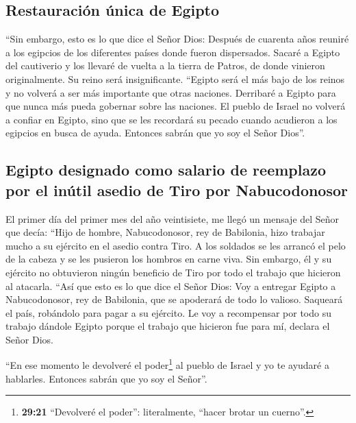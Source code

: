 \hypertarget{restauraciuxf3n-uxfanica-de-egipto}{%
\subsection{Restauración única de
Egipto}\label{restauraciuxf3n-uxfanica-de-egipto}}

 ``Sin embargo, esto es lo que dice el Señor Dios:
Después de cuarenta años reuniré a los egipcios de los diferentes países
donde fueron dispersados.  Sacaré a Egipto del cautiverio
y los llevaré de vuelta a la tierra de Patros, de donde vinieron
originalmente. Su reino será insignificante.  ``Egipto
será el más bajo de los reinos y no volverá a ser más importante que
otras naciones. Derribaré a Egipto para que nunca más pueda gobernar
sobre las naciones.  El pueblo de Israel no volverá a
confiar en Egipto, sino que se les recordará su pecado cuando acudieron
a los egipcios en busca de ayuda. Entonces sabrán que yo soy el Señor
Dios''.

\hypertarget{egipto-designado-como-salario-de-reemplazo-por-el-inuxfatil-asedio-de-tiro-por-nabucodonosor}{%
\subsection{Egipto designado como salario de reemplazo por el inútil
asedio de Tiro por
Nabucodonosor}\label{egipto-designado-como-salario-de-reemplazo-por-el-inuxfatil-asedio-de-tiro-por-nabucodonosor}}

 El primer día del primer mes del año veintisiete, me
llegó un mensaje del Señor que decía:  ``Hijo de hombre,
Nabucodonosor, rey de Babilonia, hizo trabajar mucho a su ejército en el
asedio contra Tiro. A los soldados se les arrancó el pelo de la cabeza y
se les pusieron los hombros en carne viva. Sin embargo, él y su ejército
no obtuvieron ningún beneficio de Tiro por todo el trabajo que hicieron
al atacarla.  ``Así que esto es lo que dice el Señor
Dios: Voy a entregar Egipto a Nabucodonosor, rey de Babilonia, que se
apoderará de todo lo valioso. Saqueará el país, robándolo para pagar a
su ejército.  Le voy a recompensar por todo su trabajo
dándole Egipto porque el trabajo que hicieron fue para mí, declara el
Señor Dios.

 ``En ese momento le devolveré el poder\footnote{\textbf{29:21}
  ``Devolveré el poder'': literalmente, ``hacer brotar un cuerno''.} al
pueblo de Israel y yo te ayudaré a hablarles. Entonces sabrán que yo soy
el Señor''.


